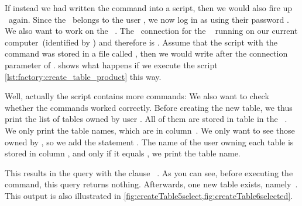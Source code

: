 If instead we had written the command into a script, then we would also fire up \psql\ again.
Since the \db\ belongs to the user , we now log in as  using their password .
We also want to work on the \db\ .
The \postgresql\ connection  for the \db\  running on our current computer~(identified by \localhost) and therefore is .
Assume that the script with the command was stored in a file called , then we would write  after the connection  parameter of \psql.
 shows what happens if we execute the script \cref{lst:factory:create_table_product} this way.

Well, actually the script contains more commands:
We also want to check whether the commands worked correctly.
Before creating the new table, we thus print the list of tables owned by user .
All of them are stored in table  in the \postgresql\ .
We only print the table names, which are in column~.
We only want to see those owned by , so we add the statement .
The name of the user owning each table is stored in column , and only if it equals , we print the table name.%
%
\begin{sloppypar}%
This results in the query  with the clause ~\cite{PGDG:PD:SC:S}.
As you can see, before executing the  command, this query returns nothing.
Afterwards, one new table exists, namely~.
This output is also illustrated in \cref{fig:createTable5select,fig:createTable6selected}.%
\end{sloppypar}%
\FloatBarrier%
\endhsection%
%
